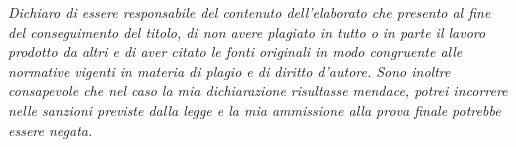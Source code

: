 \thispagestyle{plain}
\vspace*{\fill}
\textit{Dichiaro di essere responsabile del contenuto dell’elaborato che presento al fine del conseguimento del titolo, di non avere plagiato in tutto o in parte il lavoro prodotto da altri e di aver citato le fonti originali in modo congruente alle normative vigenti in materia di plagio e di diritto d’autore. Sono inoltre consapevole che nel caso la mia dichiarazione risultasse mendace, potrei incorrere nelle sanzioni previste dalla legge e la mia ammissione alla prova finale potrebbe essere negata.}
\vspace*{\fill}